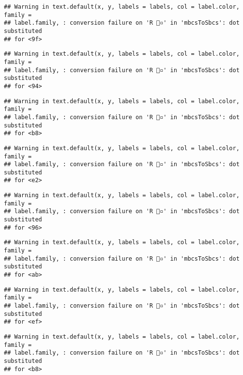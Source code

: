 \documentclass[
]{article}
\begin{document}
\begin{verbatim}
## Warning in text.default(x, y, labels = labels, col = label.color, family =
## label.family, : conversion failure on 'R 🔸▫️' in 'mbcsToSbcs': dot substituted
## for <9f>
\end{verbatim}

\begin{verbatim}
## Warning in text.default(x, y, labels = labels, col = label.color, family =
## label.family, : conversion failure on 'R 🔸▫️' in 'mbcsToSbcs': dot substituted
## for <94>
\end{verbatim}

\begin{verbatim}
## Warning in text.default(x, y, labels = labels, col = label.color, family =
## label.family, : conversion failure on 'R 🔸▫️' in 'mbcsToSbcs': dot substituted
## for <b8>
\end{verbatim}

\begin{verbatim}
## Warning in text.default(x, y, labels = labels, col = label.color, family =
## label.family, : conversion failure on 'R 🔸▫️' in 'mbcsToSbcs': dot substituted
## for <e2>
\end{verbatim}

\begin{verbatim}
## Warning in text.default(x, y, labels = labels, col = label.color, family =
## label.family, : conversion failure on 'R 🔸▫️' in 'mbcsToSbcs': dot substituted
## for <96>
\end{verbatim}

\begin{verbatim}
## Warning in text.default(x, y, labels = labels, col = label.color, family =
## label.family, : conversion failure on 'R 🔸▫️' in 'mbcsToSbcs': dot substituted
## for <ab>
\end{verbatim}

\begin{verbatim}
## Warning in text.default(x, y, labels = labels, col = label.color, family =
## label.family, : conversion failure on 'R 🔸▫️' in 'mbcsToSbcs': dot substituted
## for <ef>
\end{verbatim}

\begin{verbatim}
## Warning in text.default(x, y, labels = labels, col = label.color, family =
## label.family, : conversion failure on 'R 🔸▫️' in 'mbcsToSbcs': dot substituted
## for <b8>
\end{verbatim}
\end{document}
